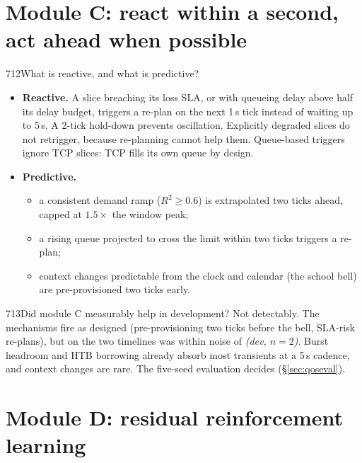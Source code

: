 \section{Module C: react within a second, act ahead when possible}

\begin{qa}{712}{What is reactive, and what is predictive?}
\begin{itemize}
\item \textbf{Reactive.} A slice breaching its loss SLA, or with queueing delay above half its delay budget, triggers a
re-plan on the next 1\,s tick instead of waiting up to 5\,s. A 2-tick hold-down prevents oscillation. Explicitly
degraded slices do not retrigger, because re-planning cannot help them. Queue-based triggers ignore TCP slices: TCP
fills its own queue by design.
\item \textbf{Predictive.}
  \begin{itemize}
  \item a consistent demand ramp ($R^2\ge0.6$) is extrapolated two ticks ahead, capped at $1.5\times$ the window peak;
  \item a rising queue projected to cross the limit within two ticks triggers a re-plan;
  \item context changes predictable from the clock and calendar (the school bell) are pre-provisioned two ticks early.
  \end{itemize}
\end{itemize}
\end{qa}

\begin{qa}{713}{Did module C measurably help in development?}
Not detectably. The mechanisms fire as designed (pre-provisioning two ticks before the bell, SLA-risk re-plans), but
on the two timelines  was within noise of  \emph{(dev, $n{=}2$)}. Burst headroom and
HTB borrowing already absorb most transients at a 5\,s cadence, and context changes are rare. The five-seed evaluation
decides (\S\ref{sec:qoseval}).
\end{qa}

\section{Module D: residual reinforcement learning}

